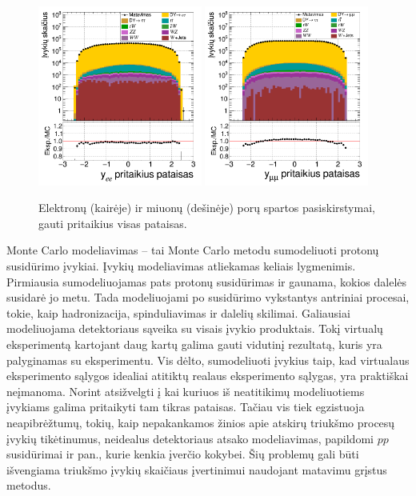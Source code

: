 \documentclass[a4paper, 12pt, twoside]{article}
\begin{document}
\begin{figure}[tbp]
	\includegraphics[width=0.48\textwidth]{ee_rapi_after.png}
	\includegraphics[width=0.48\textwidth]{mumu_rapi_after.png}
	\caption{\label{fig:rapia} Elektronų (kairėje) ir miuonų (dešinėje) porų spartos pasiskirstymai,
		gauti pritaikius visas pataisas.}
\end{figure}

Monte Carlo modeliavimas -- tai Monte Carlo metodu sumodeliuoti protonų susidūrimo įvykiai.
Įvykių modeliavimas atliekamas keliais lygmenimis.
Pirmiausia sumodeliuojamas pats protonų susidūrimas ir gaunama, kokios dalelės susidarė jo metu.
Tada modeliuojami po susidūrimo vykstantys antriniai procesai, tokie, kaip hadronizacija, spinduliavimas ir dalelių skilimai.
Galiausiai modeliuojama detektoriaus sąveika su visais įvykio produktais.
Tokį virtualų eksperimentą kartojant daug kartų galima gauti vidutinį rezultatą, kuris yra palyginamas su eksperimentu.
Vis dėlto, sumodeliuoti įvykius taip, kad virtualaus eksperimento sąlygos idealiai atitiktų realaus eksperimento sąlygas,
yra praktiškai neįmanoma.
Norint atsižvelgti į kai kuriuos iš neatitikimų modeliuotiems įvykiams galima pritaikyti tam tikras pataisas.
Tačiau vis tiek egzistuoja neapibrėžtumų, tokių, kaip nepakankamos žinios apie atskirų triukšmo procesų įvykių tikėtinumus,
neidealus detektoriaus atsako modeliavimas, papildomi $pp$ susidūrimai ir pan., kurie kenkia įverčio kokybei.
Šių problemų gali būti išvengiama triukšmo įvykių skaičiaus įvertinimui naudojant matavimu grįstus metodus.
\end{document}
